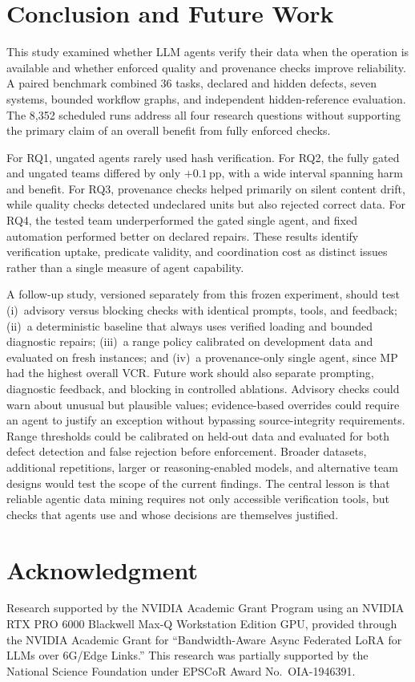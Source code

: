 \documentclass[conference]{IEEEtran}
\newcommand{\sys}[1]{\textsf{#1}}
\begin{document}
\section{Conclusion and Future Work}
This study examined whether LLM agents verify their data when the operation is available and whether enforced quality and provenance checks improve reliability. A paired benchmark combined 36 tasks, declared and hidden defects, seven systems, bounded workflow graphs, and independent hidden-reference evaluation. The 8,352 scheduled runs address all four research questions without supporting the primary claim of an overall benefit from fully enforced checks.

For RQ1, ungated agents rarely used hash verification. For RQ2, the fully gated and ungated teams differed by only $+0.1$\,pp, with a wide interval spanning harm and benefit. For RQ3, provenance checks helped primarily on silent content drift, while quality checks detected undeclared units but also rejected correct data. For RQ4, the tested team underperformed the gated single agent, and fixed automation performed better on declared repairs. These results identify verification uptake, predicate validity, and coordination cost as distinct issues rather than a single measure of agent capability.

A follow-up study, versioned separately from this frozen experiment, should test (i)~advisory versus blocking checks with identical prompts, tools, and feedback; (ii)~a deterministic baseline that always uses verified loading and bounded diagnostic repairs; (iii)~a range policy calibrated on development data and evaluated on fresh instances; and (iv)~a provenance-only single agent, since \sys{MP} had the highest overall VCR. Future work should also separate prompting, diagnostic feedback, and blocking in controlled ablations. Advisory checks could warn about unusual but plausible values; evidence-based overrides could require an agent to justify an exception without bypassing source-integrity requirements. Range thresholds could be calibrated on held-out data and evaluated for both defect detection and false rejection before enforcement. Broader datasets, additional repetitions, larger or reasoning-enabled models, and alternative team designs would test the scope of the current findings. The central lesson is that reliable agentic data mining requires not only accessible verification tools, but checks that agents use and whose decisions are themselves justified.

\section*{Acknowledgment}
Research supported by the NVIDIA Academic Grant Program using an NVIDIA RTX PRO 6000 Blackwell Max-Q Workstation Edition GPU, provided through the NVIDIA Academic Grant for ``Bandwidth-Aware Async Federated LoRA for LLMs over 6G/Edge Links.'' This research was partially supported by the National Science Foundation under EPSCoR Award No.\ OIA-1946391.
\end{document}
